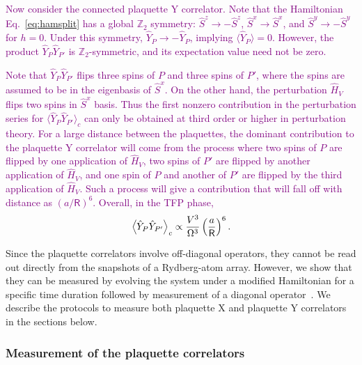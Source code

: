 \documentclass[twocolumn,superscriptaddress,amsmath,amssymb,aps,prx,nofootinbib]{revtex4-2}
\newcommand{\newtext}[1]{\textcolor{purple}{#1}}
\begin{document}
\newtext{Now consider the connected plaquette Y correlator. 
Note that the Hamiltonian Eq.~\eqref{eq:hamsplit} has a global $\mathbb{Z}_2$ symmetry: $\hat{S}^z \rightarrow -\hat{S}^z$, $\hat{S}^x \rightarrow \hat{S}^x$, and $\hat{S}^y \rightarrow -\hat{S}^y$ for $h=0$. Under this symmetry, $\hat{Y}_P \rightarrow -\hat{Y}_P$, implying  $\langle \hat{Y}_P \rangle = 0$. 
However, the product $\hat{Y}_P \hat{Y}_{P'}$ is $\mathbb{Z}_2$-symmetric, and its expectation value need not be zero. }

\newtext{Note that $\hat{Y}_P \hat{Y}_{P'}$ flips three spins of $P$ and three spins of $P'$, where the spins are assumed to be in the eigenbasis of  $\hat{S}^x$. On the other hand, the perturbation $\hat{H}_V$ flips two spins in $\hat{S}^x$ basis. Thus the first nonzero contribution in the perturbation series for $\langle \hat{Y}_P \hat{Y}_{P'} \rangle_c$ can only be obtained at third order or higher in perturbation theory. For a large distance between the plaquettes, the dominant contribution to the plaquette Y correlator will come from the process where two spins of $P$ are flipped by one application of $\hat{H}_V$, two spins of $P'$ are flipped by another application of $\hat{H}_V$, and one spin of $P$ and another of $P'$ are flipped by the third application of $\hat{H}_V$. Such a process will give a contribution that will fall off with distance as $\left(a / \mathsf{R} \right)^6$. Overall, in the TFP phase,
\begin{equation}
    \label{eq:Y_plaq_corr_TFP}
        \expval{ \hat{Y}_P \hat{Y}_{P'} }_{c} \propto \frac{V^3}{\Omega^3 } \left( \frac{a}{\mathsf{R}} \right)^{6}.
\end{equation}}

Since the plaquette correlators involve off-diagonal operators, they cannot be read out directly from the snapshots of a Rydberg-atom array. However, we show  that they can be measured by evolving the system under a modified Hamiltonian for a specific time duration followed by measurement of a diagonal operator~\cite{verresen2021, semeghini2021}. We describe the protocols to measure both plaquette X and plaquette Y correlators in the sections below.


\subsubsection{Measurement of the plaquette correlators} \label{sec:xy_plaq_corr}
\end{document}
